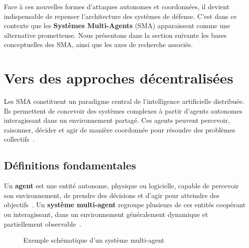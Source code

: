 \documentclass[ twoside,openright,titlepage,numbers=noenddot,headinclude,%
                footinclude=true,cleardoublepage=empty,abstractoff, %
                BCOR=5mm,paper=a4,fontsize=11pt,%
                french,american,%
                ]{scrreprt}
\begin{document}
\noindent
Face à ces nouvelles formes d'attaques autonomes et coordonnées, il devient indispensable de repenser l'architecture des systèmes de défense. C'est dans ce contexte que les \textbf{Systèmes Multi-Agents} (SMA) apparaissent comme une alternative prometteuse. Nous présentons dans la section suivante les bases conceptuelles des SMA, ainsi que les axes de recherche associés.

\section{Vers des approches décentralisées}\label{sec:sma-concepts}


Les SMA constituent un paradigme central de l'intelligence artificielle distribuée. Ils permettent de concevoir des systèmes complexes à partir d'agents autonomes interagissant dans un environnement partagé. Ces agents peuvent percevoir, raisonner, décider et agir de manière coordonnée pour résoudre des problèmes collectifs~\cite{Ferber1999,Wooldridge2009}.

\subsection*{Définitions fondamentales}

Un \textbf{agent} est une entité autonome, physique ou logicielle, capable de percevoir son environnement, de prendre des décisions et d'agir pour atteindre des objectifs~\cite{Russell2010}. Un \textbf{système multi-agent} regroupe plusieurs de ces entités coopérant ou interagissant, dans un environnement généralement dynamique et partiellement observable~\cite{Jennings1998,Shoham2009}.

\begin{figure}[h]
    \centering
    \caption{Exemple schématique d'un système multi-agent}
    \label{fig:sma_architecture}
\end{figure}
\end{document}
